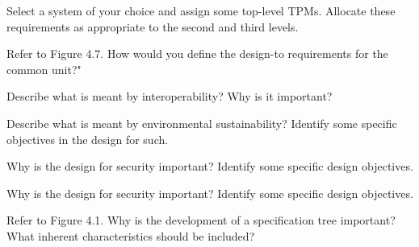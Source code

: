 \begin{exercises}
    \begin{exercise}
    \label{sea-04-06}
        Select a system of your choice and assign some top-level TPMs. Allocate these requirements as appropriate to the second and third levels.
    \end{exercise}
    \begin{solution}
    \end{solution}
    
    \begin{exercise}
    \label{sea-04-07}
        Refer to Figure 4.7. How would you define the design-to requirements for the common unit?"
    \end{exercise}
    \begin{solution}
    \end{solution}
    
    \begin{exercise}
    \label{sea-04-08}
        Describe what is meant by interoperability? Why is it important?
    \end{exercise}
    \begin{solution}
    \end{solution}
    
    \begin{exercise}
    \label{sea-04-09}
        Describe what is meant by environmental sustainability? Identify some specific objectives in the design for such. 
    \end{exercise}
    \begin{solution}
    \end{solution}
    
    \begin{exercise}
    \label{sea-04-10}
        Why is the design for security important? Identify some specific design objectives. 
    \end{exercise}
    \begin{solution}
    \end{solution}
    
    \begin{exercise}
    \label{sea-04-11}
        Why is the design for security important? Identify some specific design objectives. 
    \end{exercise}
    \begin{solution}
    \end{solution}
    
    \begin{exercise}
    \label{sea-04-12}
        Refer to Figure 4.1. Why is the development of a specification tree important? What inherent characteristics should be included?
    \end{exercise}
    \begin{solution}
    \end{solution}
    

\end{exercises}
